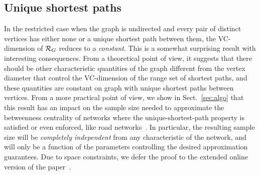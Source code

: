 
\subsection{Unique shortest paths}\label{sec:rangeunique}
In the restricted case when the graph is undirected and
every pair of distinct vertices has either none or a unique shortest path
between them, the VC-dimension of $\mathcal{R}_G$ reduces %
to a \emph{constant}. This is a
somewhat surprising result with interesting consequences. From a theoretical
point of view, it suggests that there should be other characteristic
quantities of the graph different from the vertex diameter that control the
VC-dimension of the range set of shortest paths, and these quantities are
constant on graph with unique shortest paths between vertices. From a more
practical point of view, we show in Sect.~\ref{sec:algo} that this result has an
impact on the sample size needed to approximate %
the betweenness centrality of
networks where the unique-shortest-path property is satisfied or even enforced,
like road networks~\citep{GeisbergerSS08}. In particular, the resulting sample
size will be \emph{completely independent} from any characteristic of the
network, and will only be a function of the parameters controlling the desired
approximation guarantees. 
\ifproof
\else
Due to space constraints, we defer the proof to the extended online version of
the paper~\citep{RiondatoK13}.
\fi

